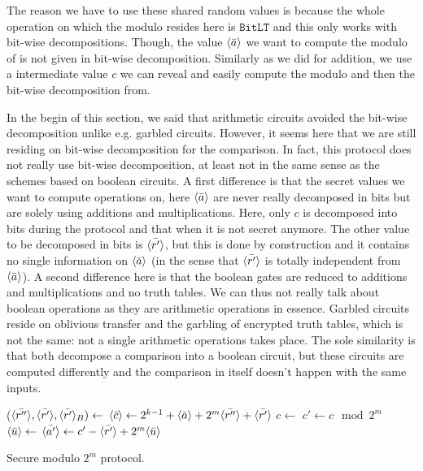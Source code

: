 The reason we have to use these shared random values is because the whole operation on which the modulo resides here is $\mathtt{BitLT}$ and this only works with bit-wise decompositions. Though, the value $\langle \bar{a} \rangle$ we want to compute the modulo of is not given in bit-wise decomposition. Similarly as we did for addition, we use a intermediate value $c$ we can reveal and easily compute the modulo and then the bit-wise decomposition from.

In the begin of this section, we said that arithmetic circuits avoided the bit-wise decomposition unlike e.g. garbled circuits. However, it seems here that we are still residing on bit-wise decomposition for the comparison. In fact, this protocol does not really use bit-wise decomposition, at least not in the same sense as the schemes based on boolean circuits. A first difference is that the secret values we want to compute operations on, here $\langle \bar{a} \rangle$ are never really decomposed in bits but are solely using additions and multiplications. Here, only $c$ is decomposed into bits during the protocol and that when it is not secret anymore. The other value to be decomposed in bits is $\langle \bar{r'} \rangle$, but this is done by construction and it contains no single information on $\langle \bar{a} \rangle$ (in the sense that $\langle \bar{r'} \rangle$ is totally independent from $\langle \bar{a} \rangle$). A second difference here is that the boolean gates are reduced to additions and multiplications and no truth tables. We can thus not really talk about boolean operations as they are arithmetic operations in essence. Garbled circuits reside on oblivious transfer and the garbling of encrypted truth tables, which is not the same: not a single arithmetic operations takes place. The sole similarity is that both decompose a comparison into a boolean circuit, but these circuits are computed differently and the comparison in itself doesn't happen with the same inputs.

\begin{center}
\begin{algorithm}[H]
\DontPrintSemicolon
{}
($\langle \bar{r''} \rangle, \langle \bar{r'} \rangle, \langle \bar{r'} \rangle_B) \leftarrow$  \;
$\langle \bar{c} \rangle \leftarrow 2^{k-1} + \langle \bar{a} \rangle + 2^m\langle \bar{r''} \rangle + \langle \bar{r'} \rangle$ \;
$c \leftarrow$  \;
$c' \leftarrow c \mod 2^m$ \;
$\langle \bar{u} \rangle \leftarrow$  \;
$\langle \bar{a'} \rangle \leftarrow c' - \langle \bar{r'} \rangle + 2^m\langle \bar{u} \rangle$ \;
\caption{Secure modulo $2^m$ protocol.}
\label{alg:mod2m}
\end{algorithm}
\end{center}


